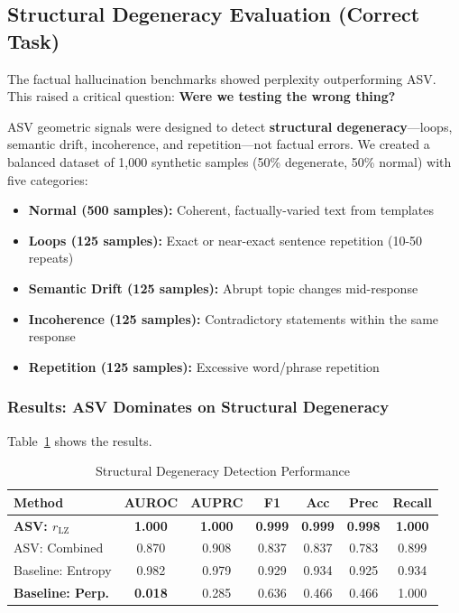\documentclass[10pt]{article}
\begin{document}
\subsection{Structural Degeneracy Evaluation (Correct Task)}
\label{sec:eval-degeneracy}

The factual hallucination benchmarks showed perplexity outperforming ASV. This raised a critical question: \textbf{Were we testing the wrong thing?}

ASV geometric signals were designed to detect \textbf{structural degeneracy}---loops, semantic drift, incoherence, and repetition---not factual errors. We created a balanced dataset of 1,000 synthetic samples (50\% degenerate, 50\% normal) with five categories:

\begin{itemize}
\item \textbf{Normal (500 samples):} Coherent, factually-varied text from templates
\item \textbf{Loops (125 samples):} Exact or near-exact sentence repetition (10-50 repeats)
\item \textbf{Semantic Drift (125 samples):} Abrupt topic changes mid-response
\item \textbf{Incoherence (125 samples):} Contradictory statements within the same response
\item \textbf{Repetition (125 samples):} Excessive word/phrase repetition
\end{itemize}

\subsubsection{Results: ASV Dominates on Structural Degeneracy}

Table~\ref{tab:degeneracy-results} shows the results.

\begin{table}[h]
\centering
\caption{Structural Degeneracy Detection Performance}
\label{tab:degeneracy-results}
\begin{tabular}{lcccccc}
\toprule
\textbf{Method} & \textbf{AUROC} & \textbf{AUPRC} & \textbf{F1} & \textbf{Acc} & \textbf{Prec} & \textbf{Recall} \\
\midrule
\textbf{ASV: $r_{\text{LZ}}$} & \textbf{1.000} & \textbf{1.000} & \textbf{0.999} & \textbf{0.999} & \textbf{0.998} & \textbf{1.000} \\
ASV: Combined & 0.870 & 0.908 & 0.837 & 0.837 & 0.783 & 0.899 \\
Baseline: Entropy & 0.982 & 0.979 & 0.929 & 0.934 & 0.925 & 0.934 \\
\textbf{Baseline: Perp.} & \textbf{0.018} & 0.285 & 0.636 & 0.466 & 0.466 & 1.000 \\
\bottomrule
\end{tabular}
\end{table}
\end{document}
